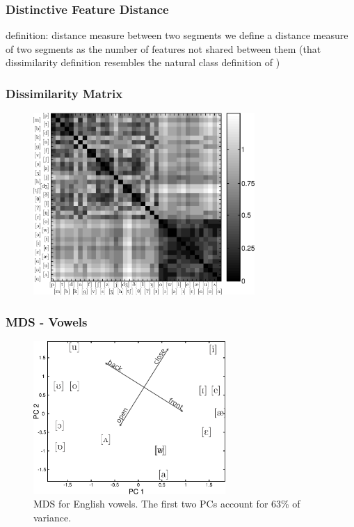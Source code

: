 \documentclass[notes]{beamer}
\begin{document}
\frame
{
  \frametitle{Distinctive Feature Distance}
  
  \begin{block}{definition: distance measure between two segments}
  we define a distance measure of two segments as the number of features not shared between
  them (that dissimilarity definition resembles the natural class definition of \cite{flemming2005})
  \end{block}
}

\frame
{
  \frametitle{Dissimilarity Matrix}
  \vspace{-0.25cm}
  \begin{figure}[h]
  \centering
  \includegraphics[width=0.75\textwidth]{imagespresentation/dissimilarity_en_matrix.png}
  \end{figure}
}

\frame
{
  \frametitle{MDS - Vowels}
  \begin{figure}[h]
  \centering
  \includegraphics[width=0.65\textwidth]{imagespresentation/mds_vowels_en.pdf}
  \caption{MDS for English vowels. The first two PCs account for 63\% of variance.}
  \end{figure}
}
\end{document}
